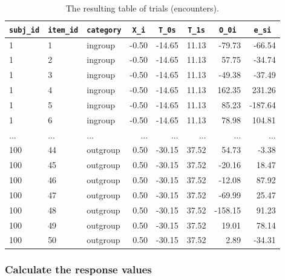 \documentclass[
  english,
  doc,floatsintext]{apa6}
\begin{document}
\begin{table}[H]

\begin{center}
\begin{threeparttable}

\caption{\label{tab:trials-table}The resulting table of trials (encounters).}

\begin{tabular}{lllrrrrr}
\toprule
\texttt{subj\_id} & \multicolumn{1}{c}{\texttt{item\_id}} & \multicolumn{1}{c}{\texttt{category}} & \multicolumn{1}{c}{\texttt{X\_i}} & \multicolumn{1}{c}{\texttt{T\_0s}} & \multicolumn{1}{c}{\texttt{T\_1s}} & \multicolumn{1}{c}{\texttt{O\_0i}} & \multicolumn{1}{c}{\texttt{e\_si}}\\
\midrule
1 & 1 & ingroup & -0.50 & -14.65 & 11.13 & -79.73 & -66.54\\
1 & 2 & ingroup & -0.50 & -14.65 & 11.13 & 57.75 & -34.74\\
1 & 3 & ingroup & -0.50 & -14.65 & 11.13 & -49.38 & -37.49\\
1 & 4 & ingroup & -0.50 & -14.65 & 11.13 & 162.35 & 231.26\\
1 & 5 & ingroup & -0.50 & -14.65 & 11.13 & 85.23 & -187.64\\
1 & 6 & ingroup & -0.50 & -14.65 & 11.13 & 78.98 & 104.81\\
... & ... & ... & ... & ... & ... & ... & ...\\
100 & 44 & outgroup & 0.50 & -30.15 & 37.52 & 54.73 & -3.38\\
100 & 45 & outgroup & 0.50 & -30.15 & 37.52 & -20.16 & 18.47\\
100 & 46 & outgroup & 0.50 & -30.15 & 37.52 & -12.08 & 87.92\\
100 & 47 & outgroup & 0.50 & -30.15 & 37.52 & -69.99 & 25.47\\
100 & 48 & outgroup & 0.50 & -30.15 & 37.52 & -158.15 & 91.23\\
100 & 49 & outgroup & 0.50 & -30.15 & 37.52 & 19.01 & 78.14\\
100 & 50 & outgroup & 0.50 & -30.15 & 37.52 & 2.89 & -34.31\\
\bottomrule
\end{tabular}

\end{threeparttable}
\end{center}

\end{table}

\hypertarget{calculate-the-response-values}{%
\subsubsection{Calculate the response values}\label{calculate-the-response-values}}
\end{document}
